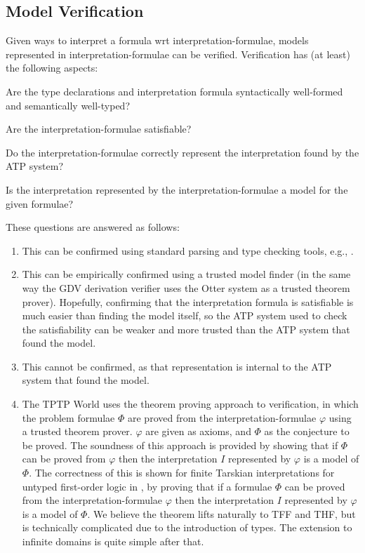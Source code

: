 \documentclass{easychair}
\newenvironment{packed_enumerate}{
\vspace*{-0.3em}
\begin{enumerate}
\setlength{\partopsep}{0pt}
\setlength{\itemsep}{1pt}
\setlength{\parskip}{0pt}
\setlength{\parsep}{0pt}
}{\end{enumerate}}
\begin{document}
\subsection{Model Verification}
\label{Verification}

Given ways to interpret a formula wrt interpretation-formulae, models represented in
interpretation-formulae can be verified.
Verification has (at least) the following aspects:
\begin{packed_enumerate}
\item Are the type declarations and interpretation formula syntactically well-formed 
      and semantically well-typed?
\item Are the interpretation-formulae satisfiable?
\item Do the interpretation-formulae correctly represent the interpretation found by the 
      ATP system?
\item Is the interpretation represented by the interpretation-formulae a model for the given 
      formulae?
\end{packed_enumerate}

These questions are answered as follows:
\begin{enumerate}
\item This can be confirmed using standard parsing and type checking tools, e.g., \cite{VS06,HR15}.
\item This can be empirically confirmed using a trusted model finder (in the same way the GDV 
      derivation verifier \cite{Sut06} uses the Otter system \cite{McC03-Otter} as a trusted 
      theorem prover).
      Hopefully, confirming that the interpretation formula is satisfiable is much easier than 
      finding the model itself, so the ATP system used to check the satisfiability can be weaker 
      and more trusted than the ATP system that found the model.
\item This cannot be confirmed, as that representation is internal to the ATP system that found
      the model.
\item The TPTP World uses the theorem proving approach to verification, in which the problem 
      formulae $\Phi$ are proved from the interpretation-formulae $\varphi$ using a trusted 
      theorem prover. 
      $\varphi$ are given as axioms, and $\Phi$ as the conjecture to be proved.
      The soundness of this approach is provided by showing that if $\Phi$ can be proved from 
      $\varphi$ then the interpretation $I$ represented by $\varphi$ is a model of $\Phi$.
      The correctness of this is shown for finite Tarskian interpretations for untyped 
      first-order logic in \cite{SS+23-LPAR}, by proving that if a formulae $\Phi$ can be 
      proved from the interpretation-formulae $\varphi$ then the interpretation $I$ 
      represented by $\varphi$ is a model of $\Phi$.
      We believe the theorem lifts naturally to TFF and THF, but is technically complicated 
      due to the introduction of types.
      The extension to infinite domains is quite simple after that.
\end{enumerate}
\end{document}

